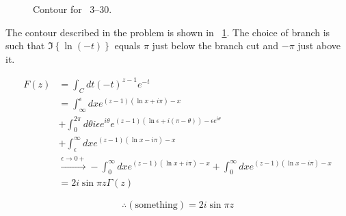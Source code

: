\item

\begin{figure}[h]
	\centering
	\caption{Contour for ~3--30.}%
	\label{fig:problem3-30}
\end{figure}

The contour described in the problem is shown in ~\ref{fig:problem3-30}.
The choice of branch is such that $\Im\left\{ \ln(-t) \right\}$ equals $\pi$ just below the branch cut
and $-\pi$ just above it.

\begin{align*}
    F(z)
    &= \int_C dt {(-t)}^{z - 1} e^{-t} \\
	&= \int_\infty^\epsilon dx e^{(z - 1) (\ln x + i\pi) - x} \\
    &+ \int_0^{2\pi} d\theta i\epsilon e^{i\theta} e^{(z - 1) (\ln\epsilon + i(\pi - \theta)) - \epsilon e^{i\theta}} \\
    &+ \int_\epsilon^\infty dx e^{(z - 1) (\ln x - i\pi) - x} \\
    &\xrightarrow{\epsilon \rightarrow 0+}
       - \int_0^\infty dx e^{(z - 1) (\ln x + i\pi) - x}
       + \int_0^\infty dx e^{(z - 1) (\ln x - i\pi) - x} \\
    &= 2i \sin \pi z \Gamma(z)
\end{align*}

\[
	\therefore (\text{something}) = 2i \sin \pi z
\]
